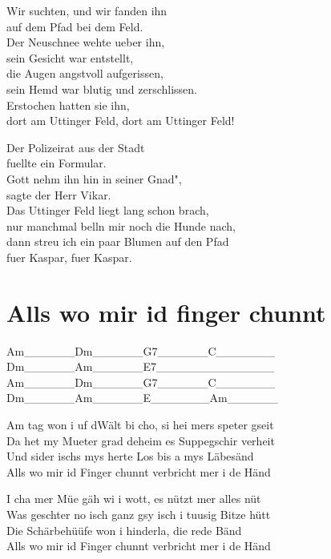 \documentclass[
  letterpaper,
]{scrbook}
\begin{document}
Wir suchten, und wir fanden ihn\\
auf dem Pfad bei dem Feld.\\
Der Neuschnee wehte ueber ihn,\\
sein Gesicht war entstellt,\\
die Augen angstvoll aufgerissen,\\
sein Hemd war blutig und zerschlissen.\\
Erstochen hatten sie ihn,\\
dort am Uttinger Feld, dort am Uttinger Feld!

Der Polizeirat aus der Stadt\\
fuellte ein Formular.\\
Gott nehm\textquotesingle{} ihn hin in seiner Gnad"\textquotesingle,\\
sagte der Herr Vikar.\\
Das Uttinger Feld liegt lang schon brach,\\
nur manchmal bell\textquotesingle n mir noch die Hunde nach,\\
dann streu\textquotesingle{} ich ein paar Blumen auf den Pfad\\
fuer Kaspar, fuer Kaspar.

\hypertarget{alls-wo-mir-id-finger-chunnt}{%
\chapter{Alls wo mir id finger
chunnt}\label{alls-wo-mir-id-finger-chunnt}}

\textbar Am\_\_\_\_\_\_\textbar Dm\_\_\_\_\_\_\textbar G7\_\_\_\_\_\_\textbar C\_\_\_\_\_\_\_\textbar{}\\
\textbar Dm\_\_\_\_\_\_\textbar Am\_\_\_\_\_\_\textbar E7\_\_\_\_\_\_\textbar\_\_\_\_\_\_\_\_\textbar{}\\
\textbar Am\_\_\_\_\_\_\textbar Dm\_\_\_\_\_\_\textbar G7\_\_\_\_\_\_\textbar C\_\_\_\_\_\_\_\textbar{}\\
\textbar Dm\_\_\_\_\_\_\textbar Am\_\_\_\_\_\_\textbar E\_\_\_\_\_\_\_\textbar Am\_\_\_\_\_\_\textbar{}

Am tag won i uf d\textquotesingle Wält bi cho, si hei mers speter
gseit\\
Da het my Mueter grad deheim es Suppegschir verheit\\
Und sider ischs mys herte Los bis a mys Läbesänd\\
Alls wo mir id Finger chunnt verbricht mer i de Händ

I cha mer Müe gäh wi i wott, es nützt mer alles nüt\\
Was geschter no isch ganz gsy isch i tuusig Bitze hütt\\
Die Schärbehüüfe won i hinderla, die rede Bänd\\
Alls wo mir id Finger chunnt verbricht mer i de Händ
\end{document}
